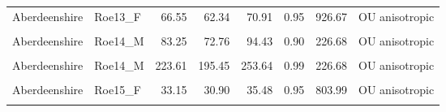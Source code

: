 \documentclass[10pt,a4paper]{article}
\begin{document}
\begin{longtable}[t]{llrrrrrl}
Aberdeenshire & Roe13\_F & 66.55 & 62.34 & 70.91 & 0.95 & 926.67 & OU anisotropic\\
\cellcolor{gray!10}{Aberdeenshire} & \cellcolor{gray!10}{Roe13\_F} & \cellcolor{gray!10}{119.95} & \cellcolor{gray!10}{112.35} & \cellcolor{gray!10}{127.79} & \cellcolor{gray!10}{0.99} & \cellcolor{gray!10}{926.67} & \cellcolor{gray!10}{OU anisotropic}\\
Aberdeenshire & Roe14\_M & 83.25 & 72.76 & 94.43 & 0.90 & 226.68 & OU anisotropic\\
\addlinespace
\cellcolor{gray!10}{Aberdeenshire} & \cellcolor{gray!10}{Roe14\_M} & \cellcolor{gray!10}{122.54} & \cellcolor{gray!10}{107.10} & \cellcolor{gray!10}{139.00} & \cellcolor{gray!10}{0.95} & \cellcolor{gray!10}{226.68} & \cellcolor{gray!10}{OU anisotropic}\\
Aberdeenshire & Roe14\_M & 223.61 & 195.45 & 253.64 & 0.99 & 226.68 & OU anisotropic\\
\cellcolor{gray!10}{Aberdeenshire} & \cellcolor{gray!10}{Roe15\_F} & \cellcolor{gray!10}{25.49} & \cellcolor{gray!10}{23.76} & \cellcolor{gray!10}{27.29} & \cellcolor{gray!10}{0.90} & \cellcolor{gray!10}{803.99} & \cellcolor{gray!10}{OU anisotropic}\\
Aberdeenshire & Roe15\_F & 33.15 & 30.90 & 35.48 & 0.95 & 803.99 & OU anisotropic\\
\cellcolor{gray!10}{Aberdeenshire} & \cellcolor{gray!10}{Roe15\_F} & \cellcolor{gray!10}{52.71} & \cellcolor{gray!10}{49.13} & \cellcolor{gray!10}{56.41} & \cellcolor{gray!10}{0.99} & \cellcolor{gray!10}{803.99} & \cellcolor{gray!10}{OU anisotropic}\\
\bottomrule
\end{longtable}
\endgroup{}

\begingroup\fontsize{9}{11}\selectfont
\end{document}
